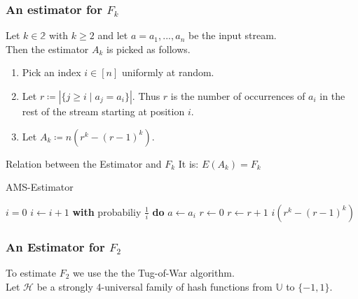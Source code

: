 \documentclass{panikzettel}
\begin{document}
\subsubsection{An estimator for $F_k$}



\begin{halfboxl}
\vspace{-\baselineskip}
	Let $k\in\mathbb{2}$ with $k\geq 2$ and let $a=a_1,...,a_n$ be the input stream.\\
	Then the estimator $A_k$ is picked as follows.
	\begin{enumerate}
	\item Pick an index $i\in [n]$ uniformly at random.
	\item Let $r\coloneqq |\{j\geq i \mid a_j=a_i \}|$. Thus $r$ is the number of occurrences of $a_i$ in the rest of the stream starting at position $i$.
	\item Let $A_k\coloneqq n(r^k-(r-1)^k)$.
	\end{enumerate}
	\begin{theo}{Relation between the Estimator and $F_k$}
	It is:
	$E(A_k)=F_k$
	\end{theo}
\end{halfboxl}
\begin{halfboxr}
\vspace{-\baselineskip}
	\begin{algo}{AMS-Estimator}
	{
	\renewcommand{\algorithmicrequire}{\textbf{Input:}}
	\renewcommand{\algorithmicensure}{\textbf{Output:}}
	  \begin{algorithmic}[1]
	  \State $i=0$
	    \State $i\leftarrow i+1$
	    \State \textbf{with} probabiliy $\frac{1}{i}$ \textbf{do}
	    \State\hspace{\algorithmicindent} $a\leftarrow a_i$
	    \State\hspace{\algorithmicindent} $r\leftarrow 0$
	      \State $r\leftarrow r+1$
	    \EndIf
	  \EndWhile
	  \State \Return $i(r^k-(r-1)^k)$
	  \end{algorithmic}
	}
	\end{algo}
\end{halfboxr}

\subsubsection{An Estimator for $F_2$}
To estimate $F_2$ we use the the Tug-of-War algorithm.\\
Let $\mathcal{H}$ be a strongly 4-universal family of hash functions from $\mathbb{U}$ to $\{-1,1\}$.
\end{document}
